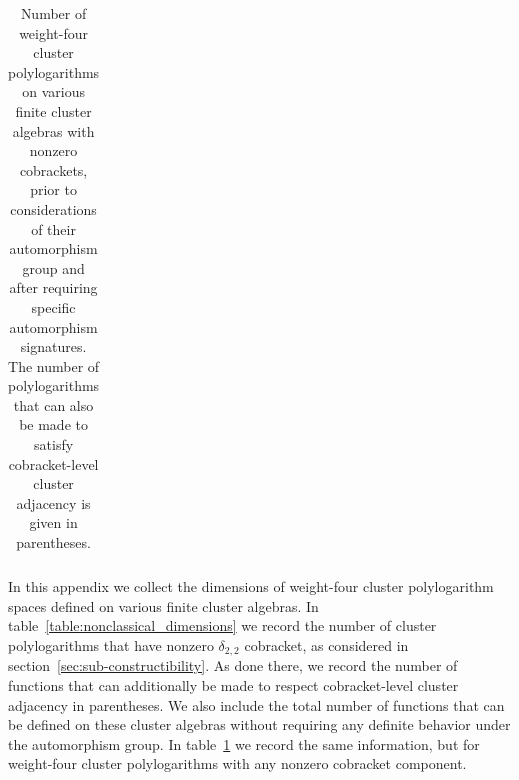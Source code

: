 \documentclass[11pt]{article}
\begin{document}
\begin{table}[t]
\begin{center}
\begin{tabular}{| c | c |}
\hline
\end{tabular}
\end{center}

\caption{Number of weight-four cluster polylogarithms on various finite cluster algebras with nonzero cobrackets, prior to considerations of their automorphism group and after requiring specific automorphism signatures. The number of polylogarithms that can also be made to satisfy cobracket-level cluster adjacency is given in parentheses.}
\label{table:total_dimensions}
\end{table}

In this appendix we collect the dimensions of weight-four cluster polylogarithm spaces defined on various finite cluster algebras. In table~\ref{table:nonclassical_dimensions} we record the number of cluster polylogarithms that have nonzero $\delta_{2,2}$ cobracket, as considered in section~\ref{sec:sub-constructibility}. As done there, we record the number of functions that can additionally be made to respect cobracket-level cluster adjacency in parentheses. We also include the total number of functions that can be defined on these cluster algebras without requiring any definite behavior under the automorphism group. In table~\ref{table:total_dimensions} we record the same information, but for weight-four cluster polylogarithms with any nonzero cobracket component. 


\newpage



\end{document}
